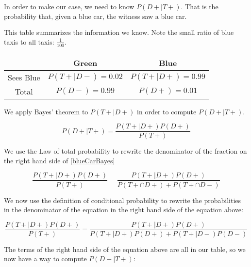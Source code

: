 \documentclass[a4paper,11pt]{article}
\begin{document}
In order to make our case, we need to know 
$P \left( D+ \mid T+ \right)$. That is the probability that, given a 
blue car, the witness saw a blue car.  

This table summarizes the information we know.  Note the small 
ratio of blue taxis to all taxis: $\frac{1}{100}$.

\begin{center}
  \begin{tabular}{ | c | c | c |  }
    \hline
         & Green & Blue     \\ \hline
    Sees Blue & $P\left(T+ \mid D- \right) = 0.02$ & $P \left( T+ \mid D+ \right)=0.99$   \\ \hline
    Total & $P \left( D- \right) = 0.99$ &  $P \left( D+ \right) = 0.01$   \\ \hline
  \end{tabular}
\end{center}

We apply Bayes' theorem \cite{reading3} to $P \left(T+ \mid D+ \right)$
in order to compute $P \left( D+ \mid T+ \right)$.

\begin{equation} \label{blueCarBayes}
P \left( D+ \mid T+ \right)
  = \frac{ P \left( T+ \mid D+ \right) P \left( D+ \right) }
    { P \left( T+ \right) }
\end{equation}

We use the Law of total probability to rewrite the denominator of the
fraction on the right hand side of \ref{blueCarBayes}

\begin{equation}
\frac{ P \left( T+ \mid D+ \right) P \left( D+ \right) }
    { P \left( T+ \right) }
  = 
\frac{ P \left( T+ \mid D+ \right) P \left( D+ \right) }
    { P \left( T+ \cap D+ \right) + P \left( T+ \cap D- \right) }
\end{equation}

We now use the definition of conditional probability to rewrite the
probabilities in the denominator of the equation in the right hand side
of the equation above:

\begin{equation}
\frac{ P \left( T+ \mid D+ \right) P \left( D+ \right) }
    { P \left( T+ \right) }
  = 
\frac{ P \left( T+ \mid D+ \right) P \left( D+ \right) }
    { P \left( T+ \mid D+ \right) P \left( D+ \right) 
      + P \left( T+ \mid D- \right) P \left(D- \right)}
\end{equation}

The terms of the right hand side of the equation above are all in our
table, so we now have a way to compute $P \left( D+ \mid T+ \right)$:
\end{document}

